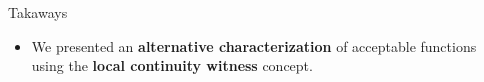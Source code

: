 \begin{frame}{Takaways}
    \pause
    \begin{itemize}
        \item We presented an \textbf{alternative characterization} of acceptable functions \pause using the \textbf{local continuity witness} concept.
    \end{itemize}
\end{frame}

